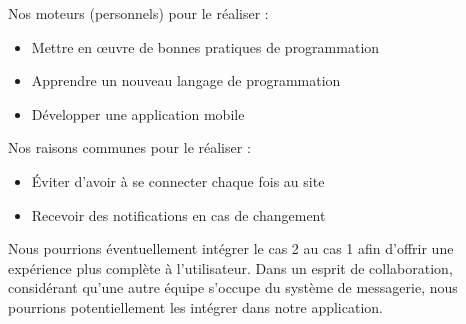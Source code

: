 		Nos moteurs (personnels) pour le réaliser : 
		\begin{itemize}
			\item Mettre en \oe uvre de bonnes pratiques de programmation
			\item Apprendre un nouveau langage de programmation
			\item Développer une application mobile
		\end{itemize} \vspace{\baselineskip}
		
		Nos raisons communes pour le réaliser :
		\begin{itemize}
			\item Éviter d'avoir à se connecter chaque fois au site
			\item Recevoir des notifications en cas de changement
		\end{itemize} \vspace{\baselineskip}
		
		Nous pourrions éventuellement intégrer le cas 2 au cas 1 afin d'offrir une expérience plus complète à l'utilisateur. Dans un esprit de collaboration, considérant qu'une autre équipe s'occupe du système de messagerie, nous pourrions potentiellement les intégrer dans notre application.
		